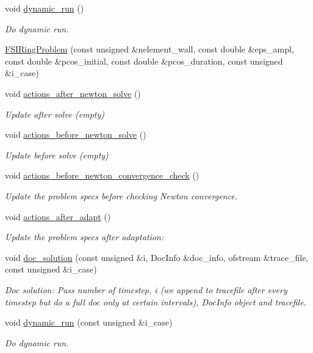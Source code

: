 \begin{DoxyCompactItemize}
void \hyperlink{classFSIRingProblem_acbb3bc5cd6d16cfee7a2f19a3b984ce7}{dynamic\+\_\+run} ()
\begin{DoxyCompactList}\small\item\em Do dynamic run. \end{DoxyCompactList}\item 
\hyperlink{classFSIRingProblem_a99a92bc3e2713063664277ce535c0af1}{F\+S\+I\+Ring\+Problem} (const unsigned \&nelement\+\_\+wall, const double \&eps\+\_\+ampl, const double \&pcos\+\_\+initial, const double \&pcos\+\_\+duration, const unsigned \&i\+\_\+case)
\item 
void \hyperlink{classFSIRingProblem_a63a3da079b167ccdc288372bee6bdbc3}{actions\+\_\+after\+\_\+newton\+\_\+solve} ()
\begin{DoxyCompactList}\small\item\em Update after solve (empty) \end{DoxyCompactList}\item 
void \hyperlink{classFSIRingProblem_a9fd26120e4e078bca685a5c94482ee12}{actions\+\_\+before\+\_\+newton\+\_\+solve} ()
\begin{DoxyCompactList}\small\item\em Update before solve (empty) \end{DoxyCompactList}\item 
void \hyperlink{classFSIRingProblem_afaf315a9b0feb319cf66b21f959e465e}{actions\+\_\+before\+\_\+newton\+\_\+convergence\+\_\+check} ()
\begin{DoxyCompactList}\small\item\em Update the problem specs before checking Newton convergence. \end{DoxyCompactList}\item 
void \hyperlink{classFSIRingProblem_af4ffa3d628230ef064a84b7c6e6a5fb8}{actions\+\_\+after\+\_\+adapt} ()
\begin{DoxyCompactList}\small\item\em Update the problem specs after adaptation\+: \end{DoxyCompactList}\item 
void \hyperlink{classFSIRingProblem_a6ffbe3f55308ea33cf2cc204062ef4ea}{doc\+\_\+solution} (const unsigned \&i, Doc\+Info \&doc\+\_\+info, ofstream \&trace\+\_\+file, const unsigned \&i\+\_\+case)
\begin{DoxyCompactList}\small\item\em Doc solution\+: Pass number of timestep, i (we append to tracefile after every timestep but do a full doc only at certain intervals), Doc\+Info object and tracefile. \end{DoxyCompactList}\item 
void \hyperlink{classFSIRingProblem_ac679e3984b85ddec7b8c2e8ab4511eac}{dynamic\+\_\+run} (const unsigned \&i\+\_\+case)
\begin{DoxyCompactList}\small\item\em Do dynamic run. \end{DoxyCompactList}\end{DoxyCompactItemize}
